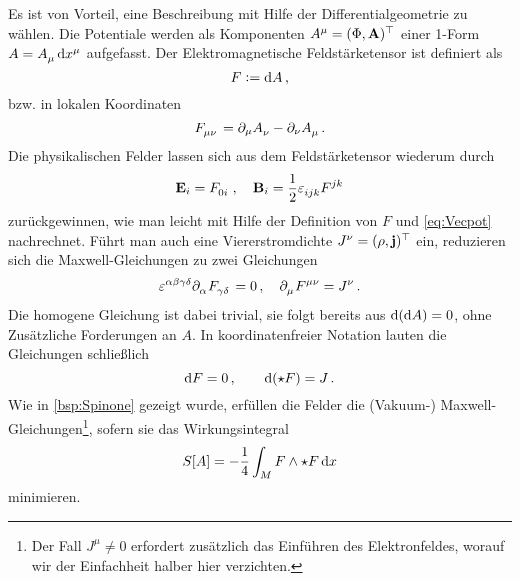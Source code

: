 Es ist von Vorteil, eine Beschreibung mit Hilfe der Differentialgeometrie
zu wählen.
Die Potentiale werden als Komponenten
$\tensor{A}{^\mu}=(\Phi,\vec{A})\transpose$ einer 1-Form
$A=\tensor{A}{_\mu}\dif\tensor{x}{^\mu}$ aufgefasst.
Der Elektromagnetische Feldstärketensor ist definiert als
\begin{equation}
F:=\dif
A\,,
\end{equation}
bzw. in lokalen Koordinaten
\begin{equation}
\tensor{F}{_\mu_\nu}=\partial_\mu\tensor{A}{_\nu}-\partial_\nu\tensor{A}{_\mu}\,.
\end{equation}
Die physikalischen Felder lassen sich aus dem Feldstärketensor wiederum durch
\begin{equation}
\vec{E}_{i}=\tensor{F}{_0_i}\,,\quad
\vec{B}_i=\frac{1}{2}\tensor{\varepsilon}{_i_j_k}\tensor{F}{^j^k}
\end{equation}
zurückgewinnen, wie man leicht mit Hilfe der Definition von $F$ und
\eqref{eq:Vecpot} nachrechnet. Führt man auch eine Viererstromdichte
$\tensor{J}{^\nu}=(\rho,\vec{j})\transpose$ ein,
reduzieren sich die Maxwell-Gleichungen zu zwei
Gleichungen
\begin{equation}
\tensor{\varepsilon}{^\alpha^\beta^\gamma^\delta}
\pdif{_{\alpha}}\tensor{F}{_\gamma_{\delta}}=0\,,\quad
\pdif{_\mu}\tensor{F}{^\mu^\nu}=\tensor{J}{^\nu}\,.
\end{equation}
Die homogene Gleichung ist dabei trivial, sie folgt bereits aus $\dif\, (\dif
A)=0$, ohne Zusätzliche Forderungen an $A$.
In koordinatenfreier Notation lauten die Gleichungen schließlich 
\begin{equation}
\dif F = 0\,,\quad\quad \dif\,(\star F)= J\,.
\end{equation}
Wie in \autoref{bsp:Spinone} gezeigt wurde, erfüllen die Felder die (Vakuum-)
Maxwell-Gleichungen\footnote{Der Fall $J^\mu\neq 0$ erfordert zusätzlich das
Einführen des Elektronfeldes, worauf wir der Einfachheit halber hier
verzichten.}, sofern sie das Wirkungsintegral
\begin{equation}
S[A]=-\frac{1}{4}\int_M F\wedge \star F\dif x
\end{equation}
minimieren.
